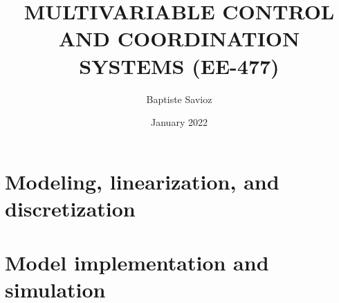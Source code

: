 \documentclass{article}
\title{MULTIVARIABLE CONTROL AND
COORDINATION SYSTEMS
(EE-477)
}
\author{Baptiste Savioz }
\date{January 2022}
\begin{document}
\label{page:titre}


\newpage
\tableofcontents
\newpage


\section{Modeling, linearization, and discretization}
\label{sec:modeling}


\newpage
\section{Model implementation and simulation}
\label{sec:implementation}




\newpage
\printbibliography 
\end{document}
